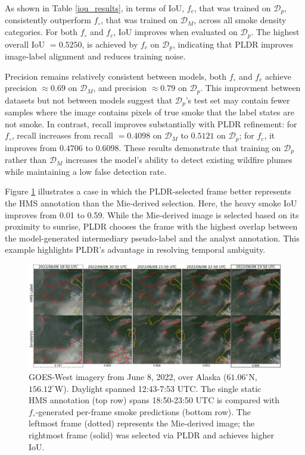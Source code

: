 \documentclass{article}
\begin{document}
As shown in Table \ref{iou_results}, in terms of IoU, \(f_c\), that was trained on \(\mathcal{D}_p\), consistently outperform \(f_{\circ}\), that was trained on \( \mathcal{D}_M \), across all smoke density categories. For both \(f_{\circ}\) and \(f_c\), IoU improves when evaluated on \(\mathcal{D}_p\). The highest overall IoU \(= 0.5250 \), is achieved by \( f_c \) on \( \mathcal{D}_p \), indicating that PLDR improves image-label alignment and reduces training noise.

Precision remains relatively consistent between models, both \( f_{\circ} \) and \( f_c \) achieve precision \(\approx 0.69 \) on \( \mathcal{D}_M \), and precision \(\approx 0.79 \) on \( \mathcal{D}_p \). This improvment between datasets but not between models suggest that \(\mathcal{D}_p\)'s test set may contain fewer samples where the image contains pixels of true smoke that the label states are not smoke. In contrast, recall improves substantially with PLDR refinement: for \( f_{\circ}\), recall increases from recall \( = 0.4098 \) on \( \mathcal{D}_M \) to \( 0.5121 \) on \( \mathcal{D}_p \); for \( f_c \), it improves from \( 0.4706 \) to \( 0.6098 \). These results demonstrate that training on \(\mathcal{D}_p\) rather than \(\mathcal{D}_M\) increases the model’s ability to detect existing wildfire plumes while maintaining a low false detection rate.

Figure \ref{ml_vs_mei} illustrates a case in which the PLDR-selected frame better represents the HMS annotation than the Mie-derived selection. Here, the heavy smoke IoU improves from 0.01 to 0.59. While the Mie-derived image is selected based on its proximity to sunrise, PLDR chooses the frame with the highest overlap between the model-generated intermediary pseudo-label and the analyst annotation. This example highlights PLDR’s advantage in resolving temporal ambiguity.

\begin{figure}[!htb] 
    \centering
    \includegraphics[width=\linewidth]{figures/final_results_small.png}
        \caption{GOES-West imagery from June 8, 2022, over Alaska (\(61.06^{\circ}\)N, \(156.12^{\circ}\)W). Daylight spanned 12:43-7:53 UTC. The single static HMS annotation (top row) spans 18:50-23:50 UTC is compared with \(f_{\circ}\)-generated per-frame smoke predictions (bottom row). The leftmost frame (dotted) represents the Mie-derived image; the rightmost frame (solid) was selected via PLDR and achieves higher IoU.}

    \label{ml_vs_mei}
\end{figure}
\end{document}
